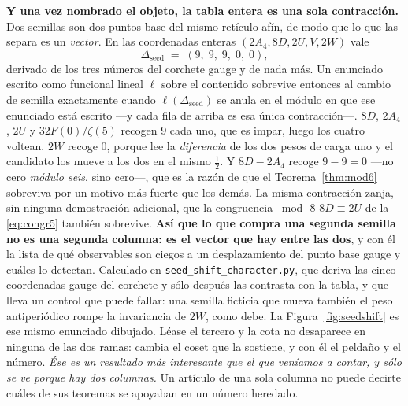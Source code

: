 \documentclass[11pt,a4paper]{article}
\begin{document}
\begin{itemize}
\noindent \textbf{Y una vez nombrado el objeto, la tabla entera es una sola contracción.} Dos
semillas son dos puntos base del mismo retículo afín, de modo que lo que las separa es un
\emph{vector}. En las coordenadas enteras $(2A_4,8D,2U,V,2W)$ vale
\[
  \Delta_{\mathrm{seed}}\;=\;(9,\;9,\;9,\;0,\;0),
\]
derivado de los tres números del corchete gauge y de nada más. Un enunciado escrito como funcional
lineal $\ell$ sobre el contenido sobrevive entonces al cambio de semilla exactamente cuando
$\ell(\Delta_{\mathrm{seed}})$ se anula en el módulo en que ese enunciado está escrito ---y cada
fila de arriba es esa única contracción---. $8D$, $2A_4$, $2U$ y $32F(0)/\zeta(5)$ recogen $9$ cada
uno, que es impar, luego los cuatro voltean. $2W$ recoge $0$, porque lee la \emph{diferencia} de los
dos pesos de carga uno y el candidato los mueve a los dos en el mismo $\tfrac12$. Y $8D-2A_4$ recoge
$9-9=0$ ---no cero \emph{módulo seis}, sino cero---, que es la razón de que el
Teorema~\ref{thm:mod6} sobreviva por un motivo más fuerte que los demás. La misma contracción zanja,
sin ninguna demostración adicional, que la congruencia $\bmod\,8$ $8D\equiv2U$ de la
\eqref{eq:congr5} también sobrevive. \textbf{Así que lo que compra una segunda semilla no es una
segunda columna: es el vector que hay entre las dos}, y con él la lista de qué observables son
ciegos a un desplazamiento del punto base gauge y cuáles lo detectan. Calculado en
\texttt{seed\_\allowbreak shift\_\allowbreak character.py}, que deriva las cinco coordenadas gauge
del corchete y sólo después las contrasta con la tabla, y que lleva un control que puede fallar: una
semilla ficticia que mueva también el peso antiperiódico rompe la invariancia de $2W$, como debe. La Figura~\ref{fig:seedshift} es ese mismo enunciado dibujado. Léase el tercero y la
cota no desaparece en ninguna de las dos ramas: cambia el coset que la sostiene, y con él el
peldaño y el número. \emph{Ése es un resultado más interesante que el que veníamos a contar, y sólo
se ve porque hay dos columnas.} Un artículo de una sola columna no puede decirte cuáles de sus
teoremas se apoyaban en un número heredado.


\end{itemize}
\end{document}

